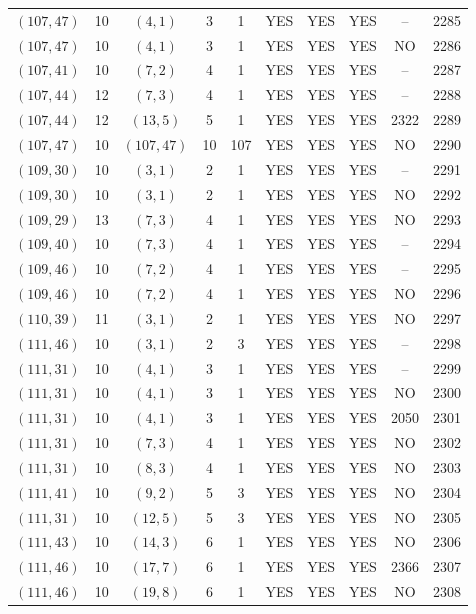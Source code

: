 \begin{longtable}{|c|c|c|c|c|c|c|c|c|c|}
$(107, 47)$ & 10 & $(4, 1)$ & 3 & 1 & YES & YES & YES & -- & 2285\\
$(107, 47)$ & 10 & $(4, 1)$ & 3 & 1 & YES & YES & YES & NO & 2286\\
$(107, 41)$ & 10 & $(7, 2)$ & 4 & 1 & YES & YES & YES & -- & 2287\\
$(107, 44)$ & 12 & $(7, 3)$ & 4 & 1 & YES & YES & YES & -- & 2288\\
$(107, 44)$ & 12 & $(13, 5)$ & 5 & 1 & YES & YES & YES & 2322 & 2289\\
$(107, 47)$ & 10 & $(107, 47)$ & 10 & 107 & YES & YES & YES & NO & 2290\\
$(109, 30)$ & 10 & $(3, 1)$ & 2 & 1 & YES & YES & YES & -- & 2291\\
$(109, 30)$ & 10 & $(3, 1)$ & 2 & 1 & YES & YES & YES & NO & 2292\\
$(109, 29)$ & 13 & $(7, 3)$ & 4 & 1 & YES & YES & YES & NO & 2293\\
$(109, 40)$ & 10 & $(7, 3)$ & 4 & 1 & YES & YES & YES & -- & 2294\\
$(109, 46)$ & 10 & $(7, 2)$ & 4 & 1 & YES & YES & YES & -- & 2295\\
$(109, 46)$ & 10 & $(7, 2)$ & 4 & 1 & YES & YES & YES & NO & 2296\\
$(110, 39)$ & 11 & $(3, 1)$ & 2 & 1 & YES & YES & YES & NO & 2297\\
$(111, 46)$ & 10 & $(3, 1)$ & 2 & 3 & YES & YES & YES & -- & 2298\\
$(111, 31)$ & 10 & $(4, 1)$ & 3 & 1 & YES & YES & YES & -- & 2299\\
$(111, 31)$ & 10 & $(4, 1)$ & 3 & 1 & YES & YES & YES & NO & 2300\\
$(111, 31)$ & 10 & $(4, 1)$ & 3 & 1 & YES & YES & YES & 2050 & 2301\\
$(111, 31)$ & 10 & $(7, 3)$ & 4 & 1 & YES & YES & YES & NO & 2302\\
$(111, 31)$ & 10 & $(8, 3)$ & 4 & 1 & YES & YES & YES & NO & 2303\\
$(111, 41)$ & 10 & $(9, 2)$ & 5 & 3 & YES & YES & YES & NO & 2304\\
$(111, 31)$ & 10 & $(12, 5)$ & 5 & 3 & YES & YES & YES & NO & 2305\\
$(111, 43)$ & 10 & $(14, 3)$ & 6 & 1 & YES & YES & YES & NO & 2306\\
$(111, 46)$ & 10 & $(17, 7)$ & 6 & 1 & YES & YES & YES & 2366 & 2307\\
$(111, 46)$ & 10 & $(19, 8)$ & 6 & 1 & YES & YES & YES & NO & 2308\\

\end{longtable}
